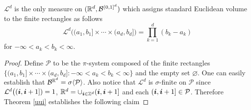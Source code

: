  \begin{theorem}
 \label{ui2}
  $\mathcal L^d$ is the only measure on $(\Bbb R^d,\mathcal B^{(0,1]^d})$ which assigns standard Euclidean volume to the finite rectangles as follows
 \begin{equation}
\mathcal L^d \bigl( (a_1,b_1]\times \cdots \times (a_d,b_d]\bigr)=\prod_{k=1}^d (b_k - a_k)
\end{equation}
for $-\infty < a_k < b_k <\infty$.
\end{theorem}
\begin{proof}
Define $\mathcal P$ to be the $\pi$-system composed of the finite rectangles $\{ (a_1,b_1]\times \cdots \times (a_d,b_d]: -\infty < a_k < b_k <\infty\}$ and the empty set $\varnothing$. One can easily establish that $\mathcal B^{\Bbb R^d}=\sigma\langle\mathcal P\rangle$.
 Also notice that $\mathcal L^d$ is $\sigma$-finite on $\mathcal P$ since  $\mathcal L^d\bigl((\boldsymbol i,\boldsymbol i+1])=1$, $\Bbb R^d = \cup_{\boldsymbol i\in\Bbb Z^d} (\boldsymbol i,\boldsymbol i+1]$ and each $(\boldsymbol i,\boldsymbol i+1]\in \mathcal P$.
 Therefore Theorem \ref{uui} establishes the following claim
\end{proof}




